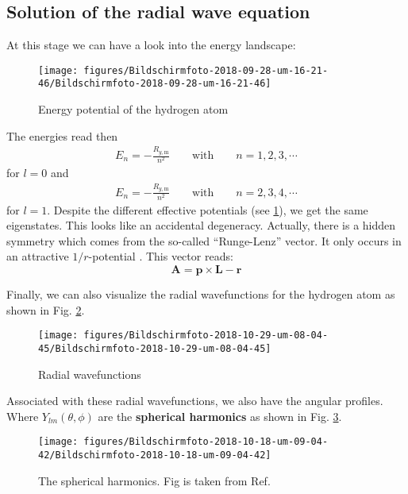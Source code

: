 \documentclass[10pt]{article}
\let\cite\citep
\providecommand\citep{\cite}
\begin{document}
\subsection{Solution of the radial wave equation}
At this stage we can have a look into the energy landscape:
\begin{figure}[h!]
\begin{center}
\texttt{[image: figures/Bildschirmfoto-2018-09-28-um-16-21-46/Bildschirmfoto-2018-09-28-um-16-21-46]}
\caption{{Energy potential of the hydrogen atom
{\label{951159}}%
}}
\end{center}
\end{figure}




The energies read then
\begin{align}
E_n = -\frac{R_{y,\textrm{m}}}{n^2} \qquad \text{with} \qquad  n=1,2,3,\cdots
\end{align}
for $l=0$ and
\begin{align}
E_n = -\frac{R_{y,\textrm{m}}}{n^2} \qquad \text{with} \qquad  n=2,3,4,\cdots
\end{align}
for $l=1$. Despite the different effective potentials (see \ref{951159}), we get the same eigenstates. This looks like an accidental degeneracy.
Actually, there is a hidden symmetry which comes from the so-called ``Runge-Lenz'' vector. It only occurs in an attractive $1/r$-potential \cite{atom}. This vector reads:
\begin{equation}
\mathbf{A} =\mathbf{p}\times\mathbf{L}-\mathbf{r}
\end{equation}

Finally, we can also visualize the radial wavefunctions for the hydrogen atom as shown in Fig. \ref{785001}.
\begin{figure}[h!]
\begin{center}
\texttt{[image: figures/Bildschirmfoto-2018-10-29-um-08-04-45/Bildschirmfoto-2018-10-29-um-08-04-45]}
\caption{{Radial wavefunctions
{\label{785001}}%
}}
\end{center}
\end{figure}

Associated with these radial wavefunctions, we also have the angular profiles. Where $Y_{lm}(\theta, \phi)$ are the \textbf{spherical harmonics} as shown in Fig. \ref{175742}.
\begin{figure}[h!]
\begin{center}
\texttt{[image: figures/Bildschirmfoto-2018-10-18-um-09-04-42/Bildschirmfoto-2018-10-18-um-09-04-42]}
\caption{{The spherical harmonics. Fig is taken from Ref.~\protect\cite{Demtr_der_2018}
{\label{175742}}%
}}
\end{center}
\end{figure}
\end{document}

